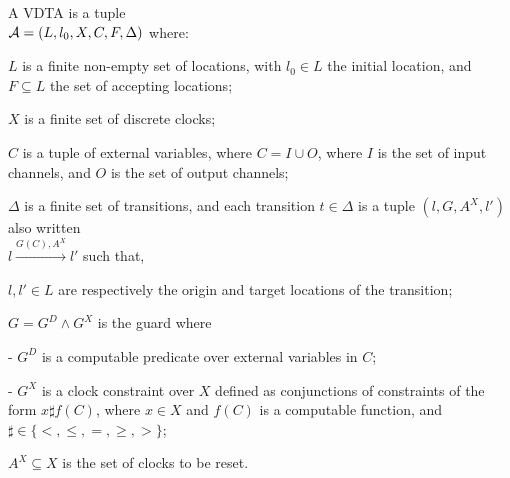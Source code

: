 %
\begin{definition}
	\label{def:ptav}
	A {VDTA} is a tuple \\
	${\mathcal A} = \left(L, {l_0}, X, C, F,  \Delta \right)$ where:
	\squishlist
	\item $L$ is a finite non-empty set of locations, with $l_0 \in L$ the initial location, and $F \subseteq L$ the set of accepting locations;
	\item $X$ is a finite set of discrete clocks;
	\item $C$ is a tuple of external variables, where $C = I \cup O$, where $I$ is the set of input channels, and $O$ is the set of output channels; 
	\item $\Delta$ is a finite set of transitions, and each transition $t \in \Delta$ is a tuple $\left( l, G, A^X, l' \right)$
	also written\\
	$l \xrightarrow{G\left( C \right),A^X} l'$
	such that,
	\squishlist
	\item[\textbullet] $l, l' \in L$ are respectively the origin and target locations of the transition;
	\item[\textbullet] $G = G^D \wedge G^X$ is the guard where
	\squishlist
	\item[-] $G^D$ 
	is a computable predicate over external variables  in $C$;
	\item[-] $G^X$ is a clock constraint over $X$ defined as conjunctions of constraints of the form $x \sharp f\left(C\right)$, where $x \in X$ and $f\left(  C \right)$ is a computable function, and $\sharp \in \{ <, \leq, =, \geq, > \}$;
	\squishend
	\item[\textbullet] $A^X \subseteq X$ is the set of clocks to be reset.
	
	\squishend
	\squishend
\end{definition}
%

